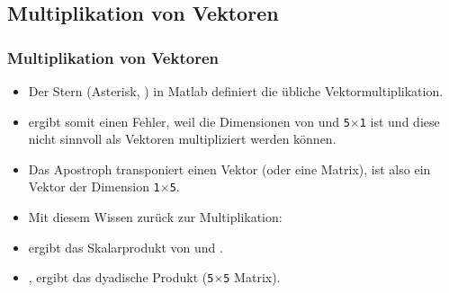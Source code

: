     \subsection{Multiplikation von Vektoren}

    \begin{frame}
      \frametitle{Multiplikation von Vektoren}
      \begin{itemize}
          \item Der Stern (Asterisk, \matlabInput{*}) in Matlab definiert die übliche Vektormultiplikation.
          \item {} ergibt somit einen Fehler, weil die Dimensionen von  und 
          \texttt{5$\times$1} ist und diese nicht sinnvoll als Vektoren multipliziert werden können.
          \item Das Apostroph  transponiert einen Vektor (oder eine Matrix),  ist also ein Vektor
          der Dimension \texttt{1$\times$5}.
          \item Mit diesem Wissen zurück zur Multiplikation:
          \item {} ergibt das Skalarprodukt von  und .
          \item {}, ergibt das dyadische Produkt (\texttt{5$\times$5} Matrix).
      \end{itemize}
    \end{frame}

